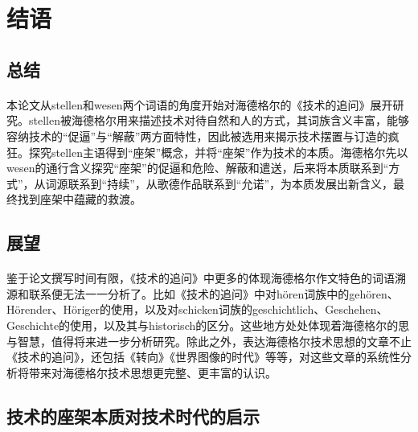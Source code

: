 \documentclass{article}
\begin{document}
\section{结语}
	\subsection{总结}
		\paragraph{}
		本论文从stellen和wesen两个词语的角度开始对海德格尔的《技术的追问》展开研究。stellen被海德格尔用来描述技术对待自然和人的方式，其词族含义丰富，能够容纳技术的“促逼”与“解蔽”两方面特性，因此被选用来揭示技术摆置与订造的疯狂。探究stellen主语得到“座架”概念，并将“座架”作为技术的本质。海德格尔先以wesen的通行含义探究“座架”的促逼和危险、解蔽和遣送，后来将本质联系到“方式”，从词源联系到“持续”，从歌德作品联系到“允诺”，为本质发展出新含义，最终找到座架中蕴藏的救渡。
	\subsection{展望}
		\paragraph{}
		鉴于论文撰写时间有限，《技术的追问》中更多的体现海德格尔作文特色的词语溯源和联系便无法一一分析了。比如《技术的追问》中对hören词族中的gehören、Hörender、Höriger的使用，以及对schicken词族的geschichtlich、Geschehen、Geschichte的使用，以及其与historisch的区分。这些地方处处体现着海德格尔的思与智慧，值得将来进一步分析研究。除此之外，表达海德格尔技术思想的文章不止《技术的追问》，还包括《转向》《世界图像的时代》等等，对这些文章的系统性分析将带来对海德格尔技术思想更完整、更丰富的认识。
	\subsection{技术的座架本质对技术时代的启示}
		\paragraph{}
		
\renewcommand\refname{参考文献}


\end{document}
